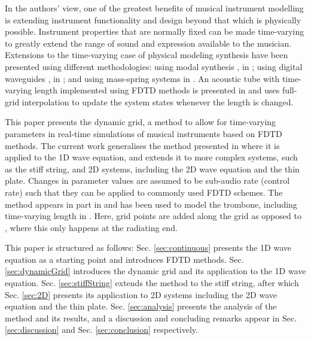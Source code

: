 \documentclass[fleqn]{jaes}
\begin{document}
In the authors' view, one of the greatest  benefits of musical instrument modelling is extending instrument functionality and design beyond that which is physically possible. Instrument properties that are normally fixed can be made time-varying to greatly extend the range of sound and expression available to the musician. Extensions to the time-varying case of physical modeling synthesis have been presented using different methodologies: using modal synthesis \cite{morrison1993mosaic}, in \cite{Mehes2016, Willemsen2017}; using digital waveguides \cite{Smith1992}, in \cite{Michon2014, serafin2005virtual}; and using mass-spring systems in \cite{leonard2013virtual}. An acoustic tube with time-varying length implemented using FDTD methods is presented in \cite{Hofmann2019} and uses full-grid interpolation to update the system states whenever the length is changed.

This paper presents the dynamic grid, a method to allow for time-varying parameters in real-time simulations of musical instruments based on FDTD methods. The current work generalises the method presented in \cite{Willemsen2021a} where it is applied to the 1D wave equation, and extends it to more complex systems, such as the stiff string, and 2D systems, including the 2D wave equation and the thin plate. Changes in parameter values are assumed to be sub-audio rate (control rate) such that they can be applied to commonly used FDTD schemes.
The method appears in part in \cite[Ch. 12]{Willemsen2021Thesis} and has been used to model the trombone, including time-varying length in \cite{Willemsen2021b}. Here, grid points are added along the grid as opposed to \cite{Hofmann2019}, where this only happens at the radiating end. 

This paper is structured as follows: Sec. \ref{sec:continuous} presents the 1D wave equation as a starting point and introduces FDTD methods. Sec. \ref{sec:dynamicGrid} introduces the dynamic grid and its application to the 1D wave equation. Sec. \ref{sec:stiffString} extends the method to the stiff string, after which Sec. \ref{sec:2D} presents its application to 2D systems including the 2D wave equation and the thin plate. Sec. \ref{sec:analysis} presents the analysis of the method and its results, and a discussion and concluding remarks appear in Sec. \ref{sec:discussion} and Sec. \ref{sec:conclusion} respectively.
\end{document}
